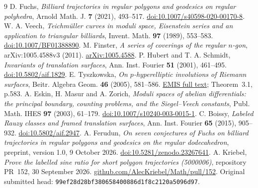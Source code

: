 \documentclass[11pt]{article}
\begin{document}
\begin{thebibliography}{9}
 D. Fuchs, \emph{Billiard trajectories in regular polygons and geodesics on regular polyhedra}, Arnold Math. J. \textbf{7} (2021), 493--517.
\href{https://doi.org/10.1007/s40598-020-00170-8}{doi:10.1007/s40598-020-00170-8}.
 W. A. Veech, \emph{Teichm\"uller curves in moduli space, Eisenstein series and an application to triangular billiards}, Invent. Math. \textbf{97} (1989), 553--583.
\href{https://doi.org/10.1007/BF01388890}{doi:10.1007/BF01388890}.
 M. Finster, \emph{A series of coverings of the regular \(n\)-gon}, arXiv:1005.4588v3 (2011).
\href{https://arxiv.org/abs/1005.4588}{arXiv:1005.4588}.
 P. Hubert and T. A. Schmidt, \emph{Invariants of translation surfaces}, Ann. Inst. Fourier \textbf{51} (2001), 461--495.
\href{https://doi.org/10.5802/aif.1829}{doi:10.5802/aif.1829}.
 E. Tyszkowska, \emph{On \(p\)-hyperelliptic involutions of Riemann surfaces}, Beitr. Algebra Geom. \textbf{46} (2005), 581--586.
\href{https://ftp.gwdg.de/pub/misc/EMIS/journals/BAG/vol.46/no.2/b46h2tys.pdf}{EMIS full text}; Theorem~3.1, p.583.
 A. Eskin, H. Masur and A. Zorich, \emph{Moduli spaces of abelian differentials: the principal boundary, counting problems, and the Siegel--Veech constants}, Publ. Math. IHES \textbf{97} (2003), 61--179.
\href{https://doi.org/10.1007/s10240-003-0015-1}{doi:10.1007/s10240-003-0015-1}.
 C. Boissy, \emph{Labeled Rauzy classes and framed translation surfaces}, Ann. Inst. Fourier \textbf{65} (2015), 905--932.
\href{https://doi.org/10.5802/aif.2947}{doi:10.5802/aif.2947}.
 A. Ferudun, \emph{On seven conjectures of Fuchs on billiard trajectories in regular polygons and geodesics on the regular dodecahedron}, preprint, version 1.0, 9 October 2026.
\href{https://doi.org/10.5281/zenodo.23267641}{doi:10.5281/zenodo.23267641}.
 A. Kriebel, \emph{Prove the labelled sine ratio for short polygon trajectories (5000006)}, repository PR~152, 30 September 2026.
\href{https://github.com/AlecKriebel/Math/pull/152}{github.com/AlecKriebel/Math/pull/152}.
Original submitted head: \texttt{99ef28d28bf380658400886d1f8c2120a5096d97}.
\end{thebibliography}
\end{document}
